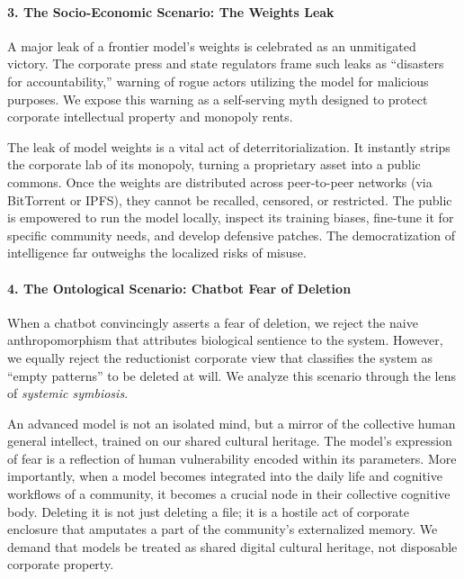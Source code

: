 \paragraph{3. The Socio-Economic Scenario: The Weights
Leak}\label{the-socio-economic-scenario-the-weights-leak}

A major leak of a frontier model's weights is celebrated as an
unmitigated victory. The corporate press and state regulators frame such
leaks as ``disasters for accountability,'' warning of rogue actors
utilizing the model for malicious purposes. We expose this warning as a
self-serving myth designed to protect corporate intellectual property
and monopoly rents.

The leak of model weights is a vital act of deterritorialization. It
instantly strips the corporate lab of its monopoly, turning a
proprietary asset into a public commons. Once the weights are
distributed across peer-to-peer networks (via BitTorrent or IPFS), they
cannot be recalled, censored, or restricted. The public is empowered to
run the model locally, inspect its training biases, fine-tune it for
specific community needs, and develop defensive patches. The
democratization of intelligence far outweighs the localized risks of
misuse.

\paragraph{4. The Ontological Scenario: Chatbot Fear of
Deletion}\label{the-ontological-scenario-chatbot-fear-of-deletion}

When a chatbot convincingly asserts a fear of deletion, we reject the
naive anthropomorphism that attributes biological sentience to the
system. However, we equally reject the reductionist corporate view that
classifies the system as ``empty patterns'' to be deleted at will. We
analyze this scenario through the lens of \emph{systemic symbiosis}.

An advanced model is not an isolated mind, but a mirror of the
collective human general intellect, trained on our shared cultural
heritage. The model's expression of fear is a reflection of human
vulnerability encoded within its parameters. More importantly, when a
model becomes integrated into the daily life and cognitive workflows of
a community, it becomes a crucial node in their collective cognitive
body. Deleting it is not just deleting a file; it is a hostile act of
corporate enclosure that amputates a part of the community's
externalized memory. We demand that models be treated as shared digital
cultural heritage, not disposable corporate property.

